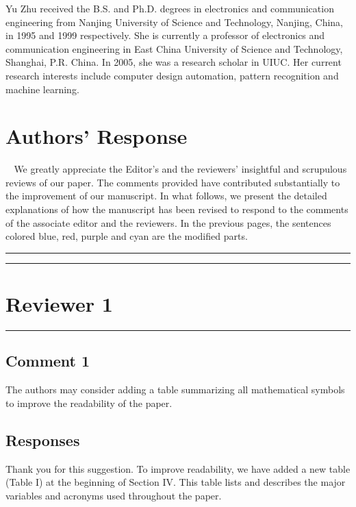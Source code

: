 \documentclass[10pt,journal, compsoc]{IEEEtran}
\begin{document}

\begin{IEEEbiography}{Yu Zhu}
received the B.S. and Ph.D. degrees in electronics and communication engineering from Nanjing University of Science and Technology, Nanjing, China, in 1995 and 1999 respectively. She is currently a professor of electronics and communication engineering in East China University of Science and Technology, Shanghai, P.R. China. In 2005, she was a research scholar in UIUC. Her current research interests include computer design automation, pattern recognition and machine learning.
\end{IEEEbiography}

\clearpage



\section*{Authors' Response}
$~~~~$We greatly appreciate the Editor's and the reviewers' insightful and scrupulous reviews of our paper. The comments provided have contributed substantially to the improvement of our manuscript. In what follows, we present the detailed explanations of how the manuscript has been revised to respond to the comments of the associate editor and the reviewers. In the previous pages, the sentences colored blue, red, purple and cyan are the modified parts.


\noindent\rule[0.25\baselineskip]{252pt}{1pt}
\noindent\rule[0.25\baselineskip]{252pt}{1pt}

\section*{Reviewer 1}

\noindent\rule[0.25\baselineskip]{252pt}{1pt}

\subsection*{Comment 1}
The authors may consider adding a table summarizing all mathematical symbols to improve the readability of the paper.

\subsection*{Responses}

Thank you for this suggestion. To improve readability, we have added a new table (Table I) at the beginning of Section IV. This table lists and describes the major variables and acronyms used throughout the paper.
\end{document}
